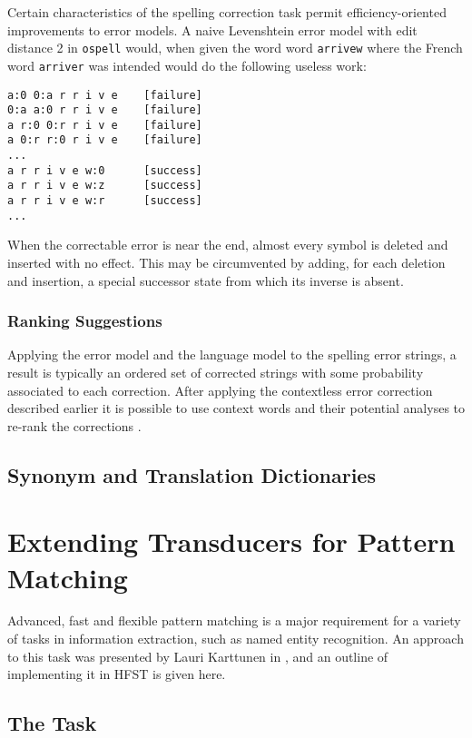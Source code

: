 \documentclass{llncs}
\begin{document}
Certain characteristics of the spelling correction task permit
efficiency-oriented improvements to error models. A naive Levenshtein error
model with edit distance 2 in \verb!ospell! would, when given the word
word \verb!arrivew! where the French word \verb!arriver! was intended would
do the following useless work:

\begin{verbatim}
a:0 0:a r r i v e    [failure]
0:a a:0 r r i v e    [failure]
a r:0 0:r r i v e    [failure]
a 0:r r:0 r i v e    [failure]
...
a r r i v e w:0      [success]
a r r i v e w:z      [success]
a r r i v e w:r      [success]
...
\end{verbatim}

When the correctable error is near the end, almost every symbol is deleted and
inserted with no effect. This may be circumvented by adding, for each deletion
and insertion, a special successor state from which its inverse is absent.

\subsubsection{Ranking Suggestions}

Applying the error model and the language model to the spelling error strings,
a result is typically an ordered set of corrected strings with some probability
associated to each correction. After applying the contextless error correction
described earlier it is possible to use context words and their potential
analyses to re-rank the corrections \cite{pirinen/2012/cicling}.

\subsection{Synonym and Translation Dictionaries}

\section{Extending Transducers for Pattern Matching}
Advanced, fast and flexible pattern matching is a major requirement for a
variety of tasks in information extraction, such as named entity recognition.
An approach to this task was presented by Lauri Karttunen in
\cite{karttunen2011}, and an outline of implementing it in HFST is given here.

\subsection{The Task}
\end{document}

